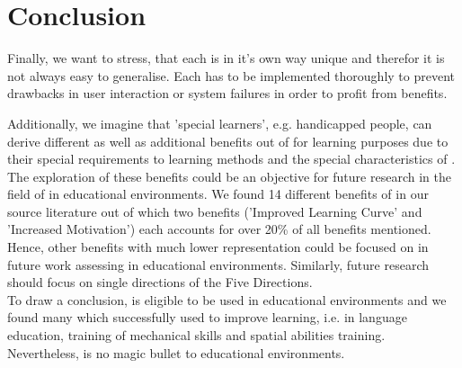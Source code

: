 \section{Conclusion}
\label{sec:Conclusion}
Finally, we want to stress, that each \AR \app is in it's own way unique and therefor it is not always easy to generalise. Each \app has to be implemented thoroughly to prevent drawbacks in user interaction or system failures in order to profit from benefits.

Additionally, we imagine that 'special learners', e.g. handicapped people, can derive different as well as additional benefits out of \AR \apps for learning purposes due to their special requirements to learning methods and the special characteristics of \ARns. The exploration of these benefits could be an objective for future research in the field of \AR \apps in educational environments.
We found 14 different benefits of \AR in our source literature out of which two benefits ('Improved Learning Curve' and 'Increased Motivation') each accounts for over 20\% of all benefits mentioned. Hence, other benefits with much lower representation could be focused on in future work assessing \AR \apps in educational environments. Similarly, future research should focus on single directions of the Five Directions.\\
To draw a conclusion, \AR is eligible to be used in educational environments and we found many \apps which successfully used \AR to improve learning, i.e. in language education, training of mechanical skills and spatial abilities training. Nevertheless, \AR is no magic bullet to educational environments.





